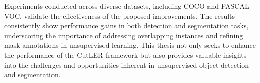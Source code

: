 Experiments conducted across diverse datasets, including COCO and PASCAL VOC, validate the effectiveness of the proposed improvements. The results consistently show performance gains in both detection and segmentation tasks, underscoring the importance of addressing overlapping instances and refining mask annotations in unsupervised learning. This thesis not only seeks to enhance the performance of the CutLER framework but also provides valuable insights into the challenges and opportunities inherent in unsupervised object detection and segmentation.
%
%
%
